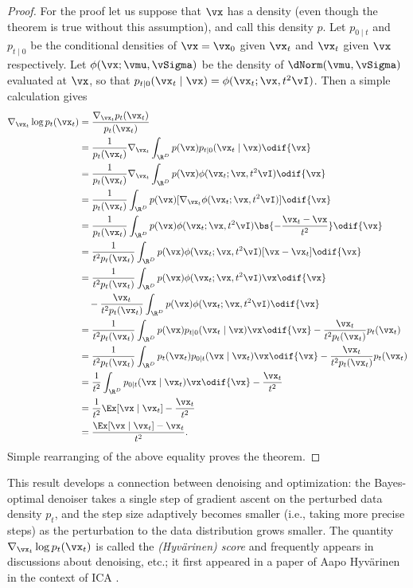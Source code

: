 \documentclass[../../book-main.tex]{subfiles}
\begin{document}
\begin{proof}
	For the proof let us suppose that \(\vx\) has a density (even though the
	theorem is true without this assumption), and call this density \(p\). Let
	\(p_{0 \mid t}\) and \(p_{t \mid 0}\) be the conditional densities of \(\vx
	= \vx_{0}\) given \(\vx_{t}\) and \(\vx_{t}\) given \(\vx\) respectively.
	Let \(\phi(\vx ; \vmu, \vSigma)\) be the density of \(\dNorm(\vmu,
	\vSigma)\) evaluated at \(\vx\), so that \(p_{t \mid 0}(\vx_{t} \mid \vx)
	= \phi(\vx_{t} ; \vx, t^{2}\vI)\). Then a simple calculation gives 
	\begin{align}
		\nabla_{\vx_{t}} \log p_{t}(\vx_{t})
		&= \frac{\nabla_{\vx_{t}}p_{t}(\vx_{t})}{p_{t}(\vx_{t})} \\
		&= \frac{1}{p_{t}(\vx_{t})}\nabla_{\vx_{t}}\int_{\R^{D}}p(\vx)p_{t \mid 0}(\vx_{t} \mid \vx)\odif{\vx} \\
		&=
		\frac{1}{p_{t}(\vx_{t})}\nabla_{\vx_{t}}\int_{\R^{D}}p(\vx)\phi(\vx_{t}
		;\vx, t^{2}\vI)\odif{\vx} \\
		&=
		\frac{1}{p_{t}(\vx_{t})}\int_{\R^{D}}p(\vx)[\nabla_{\vx_{t}}\phi(\vx_{t}
		;\vx, t^{2}\vI)]\odif{\vx} \\
		&= \frac{1}{p_{t}(\vx_{t})}\int_{\R^{D}}p(\vx)\phi(\vx_{t} ; \vx, t^{2}\vI)\bs{-\frac{\vx_{t} - \vx}{t^{2}}}\odif{\vx} \\
		&= \frac{1}{t^{2}p_{t}(\vx_{t})}\int_{\R^{D}}p(\vx)\phi(\vx_{t} ; \vx, t^{2}\vI)[\vx - \vx_{t}]\odif{\vx} \\
		&= \frac{1}{t^{2}p_{t}(\vx_{t})}\int_{\R^{D}}p(\vx)\phi(\vx_{t} ; \vx,
		t^{2}\vI)\vx \odif{\vx}\nonumber \\
		& \quad - \frac{\vx_{t}}{t^{2}p_{t}(\vx_{t})}\int_{\R^{D}}p(\vx)\phi(\vx_{t} ; \vx, t^{2}\vI)\odif{\vx} \\
		&= \frac{1}{t^{2}p_{t}(\vx_{t})}\int_{\R^{D}}p(\vx)p_{t \mid 0}(\vx_{t} \mid \vx)\vx \odif{\vx} - \frac{\vx_{t}}{t^{2}p_{t}(\vx_{t})}p_{t}(\vx_{t}) \\
		&= \frac{1}{t^{2}p_{t}(\vx_{t})}\int_{\R^{D}}p_{t}(\vx_{t})p_{0 \mid t}(\vx \mid \vx_{t})\vx \odif{\vx} - \frac{\vx_{t}}{t^{2}p_{t}(\vx_{t})}p_{t}(\vx_{t}) \\
		&= \frac{1}{t^{2}}\int_{\R^{D}}p_{0 \mid t}(\vx \mid \vx_{t})\vx \odif{\vx} - \frac{\vx_{t}}{t^{2}} \\
		&= \frac{1}{t^{2}}\Ex[\vx \mid \vx_{t}] - \frac{\vx_{t}}{t^{2}} \\
		&= \frac{\Ex[\vx \mid \vx_{t}] - \vx_{t}}{t^{2}}.
	\end{align}
	Simple rearranging of the above equality proves the theorem.
\end{proof}
This result develops a connection between denoising and optimization: the Bayes-optimal denoiser takes a single step of gradient ascent on the perturbed data density \(p_{t}\), and the step size adaptively becomes smaller (i.e., taking more precise steps) as the perturbation to the data distribution grows smaller. The quantity \(\nabla_{\vx_{t}}\log p_{t}(\vx_{t})\) is called the \textit{(Hyv\"arinen) score} and frequently appears in discussions about denoising, etc.; it first appeared in a paper of Aapo Hyv\"arinen in the context of ICA \cite{hyvarinen05a}.
\end{document}
